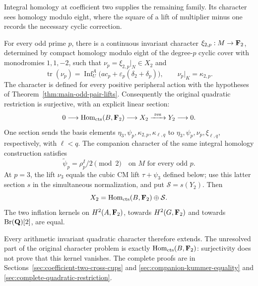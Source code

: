 Integral homology at coefficient two supplies the remaining family.
Its character sees homology modulo eight, where the square of a lift
of multiplier minus one records the necessary cyclic correction.

\begin{theorem}\label{thm:main-complete-quadratic}
For every odd prime \(p\), there is a continuous invariant
character \(\xi_{2,p}:M\to\mathbf F_2\), determined by compact homology
modulo eight of the degree-\(p\) cyclic cover with monodromies
\(1,1,-2\), such that \(\nu_p=\xi_{2,p}|_N\in X_2\) and
\[
 \operatorname{tr}(\nu_p)
     =\operatorname{Inf}_U^A
          \bigl(ac_p+\varepsilon_p(\delta_2+\delta_p)\bigr),
 \qquad \nu_p|_K=\kappa_{2,p}.
\]
The character is defined for every positive peripheral action with
the hypotheses of Theorem~\ref{thm:main-odd-pair-lifts}.
Consequently the original quadratic restriction is surjective, with
an explicit linear section:
\[
 0\longrightarrow\operatorname{Hom}_{\rm cts}(B,\mathbf F_2)
 \longrightarrow X_2\xrightarrow{\ \mathrm{res}\ }Y_2
 \longrightarrow0.
\]
One section sends the basis elements \(\eta_3,\psi_p,\kappa_{2,p},
\kappa_{\ell,q}\) to \(\eta_3,\psi_p,\nu_p,\xi_{\ell,q}\),
respectively, with \(\ell<q\). The companion character of the same
integral homology construction satisfies
\[
 \widetilde\psi_p=\rho_p^I/2\pmod2
                 \quad\text{on }M\text{ for every odd }p.
\]
At \(p=3\), the lift \(\nu_3\)
equals the cubic CM lift \(\tau+\psi_3\)
defined below; use this latter section \(s\) in the simultaneous
normalization, and put \(\mathcal S=s(Y_2)\). Then
\[
               X_2=\operatorname{Hom}_{\rm cts}(B,\mathbf F_2)
                                      \oplus\mathcal S.
\]
The two inflation kernels on \(H^2(A,\mathbf F_2)\), towards
\(H^2(G,\mathbf F_2)\) and towards \(\operatorname{Br}(\mathbf Q)[2]\),
are equal.
\end{theorem}

Every arithmetic invariant quadratic character therefore extends.
The unresolved part of the original character problem is exactly
\(\operatorname{Hom}_{\rm cts}(B,\mathbf F_2)\): surjectivity does not
prove that this kernel vanishes. The complete proofs are in
Sections~\ref{sec:coefficient-two-cross-cups} and
\ref{sec:companion-kummer-equality} and
\ref{sec:complete-quadratic-restriction}.
